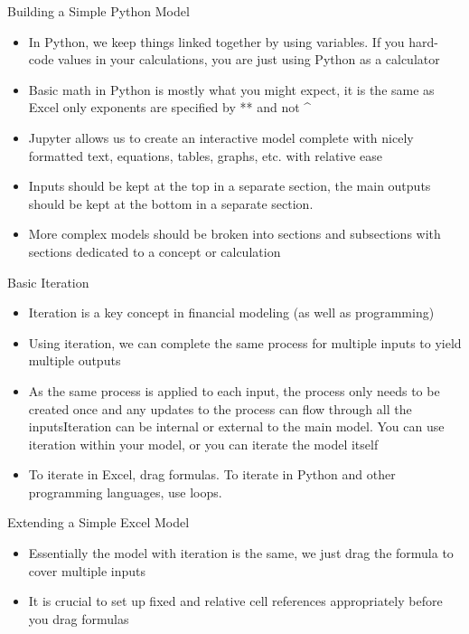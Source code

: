 \documentclass[]{article}
\begin{document}
\begin{section}{Building a Simple Python Model}
\begin{itemize}
\item In Python, we keep things linked together by using variables. If you hard-code values in your calculations, you are just using Python as a calculator
\item Basic math in Python is mostly what you might expect, it is the same as Excel only exponents are specified by ** and not \^{}
\item Jupyter allows us to create an interactive model complete with nicely formatted text, equations, tables, graphs, etc. with relative ease
\item Inputs should be kept at the top in a separate section, the main outputs should be kept at the bottom in a separate section. 
\item More complex models should be broken into sections and subsections with sections dedicated to a concept or calculation
\end{itemize}
\end{section}
\begin{section}{Basic Iteration}
\begin{itemize}
\item Iteration is a key concept in financial modeling (as well as programming)
\item Using iteration, we can complete the same process for multiple inputs to yield multiple outputs
\item As the same process is applied to each input, the process only needs to be created once and any updates to the process can flow through all the inputsIteration can be internal or external to the main model. You can use iteration within your model, or you can iterate the model itself
\item To iterate in Excel, drag formulas. To iterate in Python and other programming languages, use loops.
\end{itemize}
\end{section}
\begin{section}{Extending a Simple Excel Model}
\begin{itemize}
\item Essentially the model with iteration is the same, we just drag the formula to cover multiple inputs
\item It is crucial to set up fixed and relative cell references appropriately before you drag formulas
\end{itemize}
\end{section}
\end{document}
